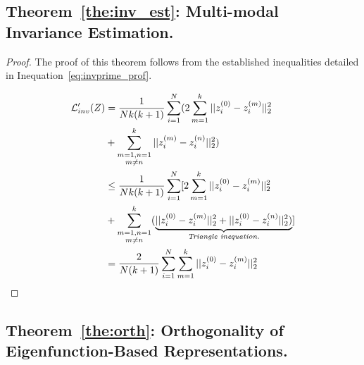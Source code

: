 \documentclass{article}
\begin{document}
\subsection{\textbf{Theorem}~\ref{the:inv_est}: Multi-modal Invariance Estimation.}\label{proof:inv}

\begin{proof}
The proof of this theorem follows from the established inequalities detailed in Inequation~\ref{eq:invprime_prof}.

\begin{equation}
\begin{aligned}\label{eq:invprime_prof}
        \mathcal{L}_{inv}^\prime(Z) & = 
         \frac{1}{Nk(k + 1)}\sum_{i=1}^N(2\sum_{m=1}^k||z^{(0)}_i-z^{(m)}_i||^2_2 \\
        & + \sum_{\substack{m=1, n=1 \\ m \neq n}}^k||z^{(m)}_i - z^{(n)}_i||^2_2) \\
        & \leq \frac{1}{Nk(k + 1)}\sum_{i=1}^N[2\sum_{m=1}^k||z^{(0)}_i-z^{(m)}_i||^2_2 \\
        & + \sum_{\substack{m=1, n=1 \\ m \neq n}}^k(\underbrace{||z^{(0)}_i - z^{(m)}_i||^2_2+||z^{(0)}_i - z^{(n)}_i||^2_2)}_{\text{\textit{Triangle inequation.}}}] \\
        & = \frac{2}{N(k+1)} \sum_{i=1}^N\sum_{m=1}^k ||z^{(0)}_i - z^{(m)}_i||^2_2
\end{aligned}
\end{equation}
\end{proof}


\subsection{\textbf{Theorem}~\ref{the:orth}: Orthogonality of Eigenfunction-Based Representations.}
\end{document}
